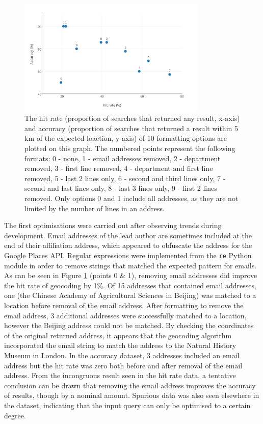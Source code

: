 \documentclass[Report.tex]{subfiles}
\begin{document}
\begin{figure}[!ht]
\begin{center}
	\includegraphics[width=0.8\textwidth]{../lib/images/geocode_performance_scatter}
	\caption{The hit rate (proportion of searches that returned any result, x-axis) and accuracy (proportion of searches that returned a result within 5 km of the expected loaction, y-axis) of 10 formatting options are plotted on this graph. The numbered points represent the following formats: 0 - none, 1 - email addresses removed, 2 - department removed, 3 - first line removed, 4 - department and first line removed, 5 - last 2 lines only, 6 - second and third lines only, 7 - second and last lines only, 8 - last 3 lines only, 9 - first 2 lines removed. Only options 0 and 1 include all addresses, as they are not limited by the number of lines in an address. \label{fig:geoscatter}}
\end{center}
\end{figure}

\noindent The first optimisations were carried out after observing trends during development. Email addresses of the lead author are sometimes included at the end of their affiliation address, which appeared to obfuscate the address for the Google Places API. Regular expressions were implemented from the \texttt{re} Python module in order to remove strings that matched the expected pattern for emails. As can be seen in Figure \ref{fig:geoscatter} (points 0 \& 1), removing email addresses did improve the hit rate of geocoding by 1\%. Of 15 addresses that contained email addresses, one (the Chinese Academy of Agricultural Sciences in Beijing) was matched to a location before removal of the email address. After formatting to remove the email address, 3 additional addresses were successfully matched to a location, however the Beijing address could not be matched. By checking the coordinates of the original returned address, it appears that the geocoding algorithm incorporated the email string to match the address to the Natural History Museum in London. In the accuracy dataset, 3 addresses included an email address but the hit rate was zero both before and after removal of the email address. From the incongruous result seen in the hit rate data, a tentative conclusion can be drawn that removing the email address improves the accuracy of results, though by a nominal amount. Spurious data was also seen elsewhere in the dataset, indicating that the input query can only be optimised to a certain degree.
\end{document}
